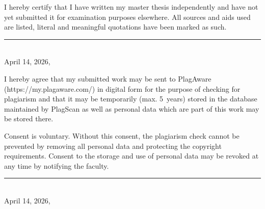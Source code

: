 

I hereby certify that I have written my master thesis independently and have not yet submitted it for examination purposes elsewhere.
All sources and aids used are listed, literal and meaningful quotations have been marked as such.

\vspace{40pt}
\begin{flushright}
  \rule{5cm}{0.4pt}\\
  April 14, 2026, \ShowThesisAuthor    
\end{flushright}


I hereby agree that my submitted work may be sent to PlagAware (https://my.plagaware.com/) in digital form for the purpose of checking for plagiarism and that it may be temporarily (max. 5~years) stored in the database maintained by PlagScan as well as personal data which are part of this work may be stored there.

\begin{small}
Consent is voluntary.
Without this consent, the plagiarism check cannot be prevented by removing all personal data and protecting the copyright requirements.
Consent to the storage and use of personal data may be revoked at any time by notifying the faculty.
\end{small}

\begin{flushright}
  \rule{5cm}{0.4pt}\\
  April 14, 2026, \ShowThesisAuthor    
\end{flushright}